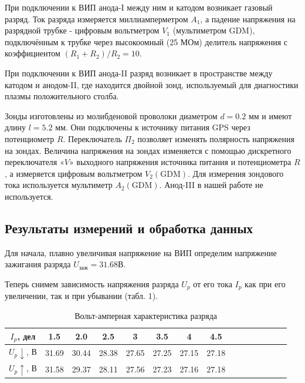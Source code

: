 \documentclass[12pt,a4paper]{article}
\begin{document}
При подключении к ВИП анода-I между ним и катодом возникает газовый разряд. 
Ток разряда измеряется миллиамперметром $A_{1}$, а падение напряжения на разрядной трубке - цифровым вольтметром $V_{1}$ (мультиметром GDM), подключённым к трубке через высокоомный (25 МОм) делитель напряжения с коэффициентом $\left(R_{1}+R_{2}\right) / R_{2}=10$.

При подключении к ВИП анода-II разряд возникает в пространстве между катодом и анодом-II, где находится двойной зонд, используемый для диагностики плазмы положительного столба.

Зонды изготовлены из молибденовой проволоки диаметром $d=0.2$ мм и имеют длину $l=5.2$ мм. 
Они подключены к источнику питания GPS через потенциометр $R$. 
Переключатель $\Pi_{2}$ позволяет изменять полярность напряжения на зондах. 
Величина напряжения на зондах изменяется с помощью дискретного переключателя «$V$» выходного напряжения источника питания и потенциометра $R$, а измеряется цифровым вольтметром $V_{2}(\mathrm{GDM})$. 
Для измерения зондового тока используется мультиметр $A_{2}(\mathrm{GDM})$. 
Анод-III в нашей работе не используется. 

\subsection*{Результаты измерений и обработка данных}
Для начала, плавно увеличивая напряжение на ВИП определим напряжение зажигания разряда $U_{заж} = 31.68В$.

Теперь снимем зависимость напряжения разряда $U_p$ от его тока $I_p$ как при его увеличении, так и при убывании (табл. 1).

\begin{table}[H]
\centering
    \begin{tabular}[]{|c|c|c|c|c|c|c|c|c|c|c|c|c|c|c|}
\hline
$I_p$, дел         & 1.5   & 2.0   & 2.5   & 3     & 3.5   & 4     & 4.5   \\ \hline
$U_p\downarrow$, В & 31.69 & 30.44 & 28.38 & 27.65 & 27.25 & 27.15 & 27.18 \\ \hline
$U_p\uparrow$, В   & 31.58 & 29.37 & 28.11 & 27.56 & 27.23 & 27.16 & 27.18 \\ \hline
\end{tabular}
    \caption{Вольт-амперная характеристика разряда}
\end{table}
\end{document}
